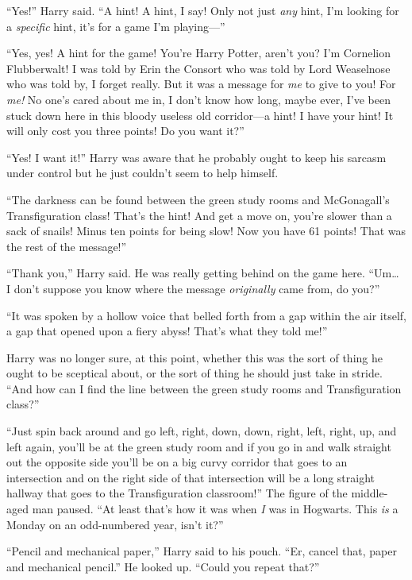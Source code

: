 ``Yes!'' Harry said. ``A hint! A hint, I say! Only not just \emph{any}
hint, I'm looking for a \emph{specific} hint, it's for a game I'm
playing---''

``Yes, yes! A hint for the game! You're Harry Potter, aren't you? I'm
Cornelion Flubberwalt! I was told by Erin the Consort who was told by
Lord Weaselnose who was told by, I forget really. But it was a message
for \emph{me} to give to you! For \emph{me!} No one's cared about me in,
I don't know how long, maybe ever, I've been stuck down here in this
bloody useless old corridor---a hint! I have your hint! It will only
cost you three points! Do you want it?''

``Yes! I want it!'' Harry was aware that he probably ought to keep his
sarcasm under control but he just couldn't seem to help himself.

``The darkness can be found between the green study rooms and
McGonagall's Transfiguration class! That's the hint! And get a move on,
you're slower than a sack of snails! Minus ten points for being slow!
Now you have 61 points! That was the rest of the message!''

``Thank you,'' Harry said. He was really getting behind on the game
here. ``Um\ldots{} I don't suppose you know where the message
\emph{originally} came from, do you?''

``It was spoken by a hollow voice that belled forth from a gap within
the air itself, a gap that opened upon a fiery abyss! That's what they
told me!''

Harry was no longer sure, at this point, whether this was the sort of
thing he ought to be sceptical about, or the sort of thing he should
just take in stride. ``And how can I find the line between the green
study rooms and Transfiguration class?''

``Just spin back around and go left, right, down, down, right, left,
right, up, and left again, you'll be at the green study room and if you
go in and walk straight out the opposite side you'll be on a big curvy
corridor that goes to an intersection and on the right side of that
intersection will be a long straight hallway that goes to the
Transfiguration classroom!'' The figure of the middle-aged man paused.
``At least that's how it was when \emph{I} was in Hogwarts. This
\emph{is} a Monday on an odd-numbered year, isn't it?''

``Pencil and mechanical paper,'' Harry said to his pouch. ``Er, cancel
that, paper and mechanical pencil.'' He looked up. ``Could you repeat
that?''

